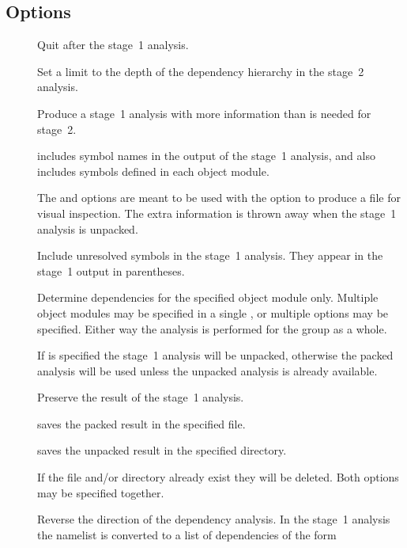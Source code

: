 \subsection*{Options}

\begin{description}
\item[]
   Quit after the stage~1 analysis.

\item[]
   Set a limit to the depth of the dependency hierarchy in the stage~2
   analysis.

\item[]
   Produce a stage~1 analysis with more information than is needed for
   stage~2.

    includes symbol names in the output of the stage~1 analysis, and
    also includes symbols defined in each object module.

   The  and  options are meant to be used with the 
   option to produce a file for visual inspection.  The extra information is
   thrown away when the stage~1 analysis is unpacked.

\item[]
   Include unresolved symbols in the stage~1 analysis.  They appear in the
   stage~1 output in parentheses.

\item[]
   Determine dependencies for the specified object module only.  Multiple
   object modules may be specified in a single , or multiple 
   options may be specified.  Either way the analysis is performed for the
   group as a whole.

   If  is specified the stage~1 analysis will be unpacked, otherwise
   the packed analysis will be used unless the unpacked analysis is already
   available.

\item[]
   Preserve the result of the stage~1 analysis.

    saves the packed result in the specified file.

    saves the unpacked result in the specified directory.

   If the file and/or directory already exist they will be deleted.  Both
   options may be specified together.

\item[]
   Reverse the direction of the dependency analysis.  In the stage~1 analysis
   the namelist is converted to a list of dependencies of the form


\end{description}
